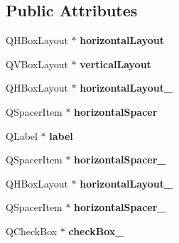 \subsection*{Public Attributes}
\begin{DoxyCompactItemize}
\item 
\hypertarget{class_ui__etat_right_ab111761269a0c67cd08f2381a575d636}{Q\-H\-Box\-Layout $\ast$ {\bfseries horizontal\-Layout}}\label{class_ui__etat_right_ab111761269a0c67cd08f2381a575d636}

\item 
\hypertarget{class_ui__etat_right_ab4333e10288126061814b741ac05be4f}{Q\-V\-Box\-Layout $\ast$ {\bfseries vertical\-Layout}}\label{class_ui__etat_right_ab4333e10288126061814b741ac05be4f}

\item 
\hypertarget{class_ui__etat_right_a66ec15f46d545ed5253055bbe5627919}{Q\-H\-Box\-Layout $\ast$ {\bfseries horizontal\-Layout\-\_}}\label{class_ui__etat_right_a66ec15f46d545ed5253055bbe5627919}

\item 
\hypertarget{class_ui__etat_right_a0d656669f8cddbef0b2a7a1329f4a172}{Q\-Spacer\-Item $\ast$ {\bfseries horizontal\-Spacer}}\label{class_ui__etat_right_a0d656669f8cddbef0b2a7a1329f4a172}

\item 
\hypertarget{class_ui__etat_right_a69154a9d4ec3d146e1afcc8da5562f56}{Q\-Label $\ast$ {\bfseries label}}\label{class_ui__etat_right_a69154a9d4ec3d146e1afcc8da5562f56}

\item 
\hypertarget{class_ui__etat_right_acae8e9100665f802d47e037d18e81e10}{Q\-Spacer\-Item $\ast$ {\bfseries horizontal\-Spacer\-\_}}\label{class_ui__etat_right_acae8e9100665f802d47e037d18e81e10}

\item 
\hypertarget{class_ui__etat_right_a8ba482a507b484fefb0d7e1eca110643}{Q\-H\-Box\-Layout $\ast$ {\bfseries horizontal\-Layout\-\_}}\label{class_ui__etat_right_a8ba482a507b484fefb0d7e1eca110643}

\item 
\hypertarget{class_ui__etat_right_a12cad950322992284d7a9961d3df0e71}{Q\-Spacer\-Item $\ast$ {\bfseries horizontal\-Spacer\-\_}}\label{class_ui__etat_right_a12cad950322992284d7a9961d3df0e71}

\item 
\hypertarget{class_ui__etat_right_a1c5e9932944d0c9ba19de130f4319a76}{Q\-Check\-Box $\ast$ {\bfseries check\-Box\-\_}}\label{class_ui__etat_right_a1c5e9932944d0c9ba19de130f4319a76}


\end{DoxyCompactItemize}
